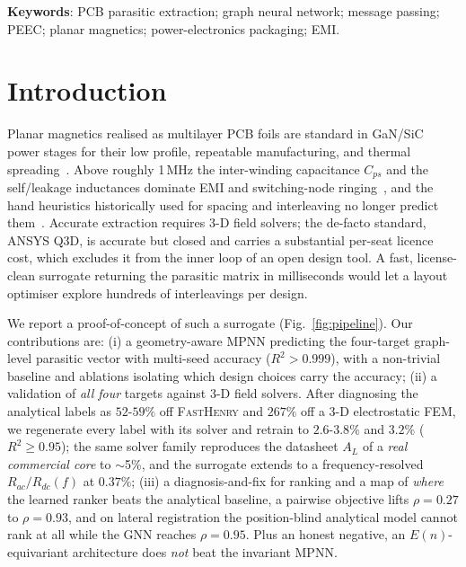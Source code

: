 \documentclass[letterpaper,twocolumn,9pt]{extarticle}
\begin{document}
\vspace{3pt}
\noindent\textbf{Keywords}: PCB parasitic extraction; graph neural network; message
passing; PEEC; planar magnetics; power-electronics packaging; EMI.

\section{Introduction}
Planar magnetics realised as multilayer PCB foils are standard in GaN/SiC power
stages for their low profile, repeatable manufacturing, and thermal
spreading~\cite{ouyang,hurley}. Above roughly 1\,MHz the inter-winding
capacitance $C_{ps}$ and the self/leakage inductances dominate EMI and
switching-node ringing~\cite{ott,paul}, and the hand heuristics historically used
for spacing and interleaving no longer predict them~\cite{erickson}. Accurate
extraction requires 3-D field solvers; the de-facto standard, ANSYS Q3D, is
accurate but closed and carries a substantial per-seat licence cost, which
excludes it from the inner loop of an open design tool. A fast, license-clean
surrogate returning the parasitic matrix in milliseconds would let a layout
optimiser explore hundreds of interleavings per design.

We report a proof-of-concept of such a surrogate (Fig.~\ref{fig:pipeline}). Our
contributions are: (i) a geometry-aware MPNN predicting the four-target
graph-level parasitic vector with multi-seed accuracy ($R^2>0.999$), with a
non-trivial baseline and ablations isolating which design choices carry the
accuracy; (ii) a validation of \emph{all four} targets against 3-D field
solvers. After diagnosing the analytical labels as $52$-$59\%$ off
\textsc{FastHenry} and $267\%$ off a 3-D electrostatic FEM, we regenerate every
label with its solver and retrain to $2.6$-$3.8\%$ and $3.2\%$
($R^2\!\ge\!0.95$); the same solver family reproduces the datasheet $A_L$ of a
\emph{real commercial core} to $\sim$5\%, and the surrogate extends to a
frequency-resolved $R_{ac}/R_{dc}(f)$ at $0.37\%$; (iii) a diagnosis-and-fix for
ranking and a map of \emph{where} the learned ranker beats the analytical
baseline, a pairwise objective lifts $\rho=0.27$ to $\rho=0.93$, and on lateral
registration the position-blind analytical model cannot rank at all while the GNN
reaches $\rho=0.95$. Plus an honest negative, an $E(n)$-equivariant architecture
does \emph{not} beat the invariant MPNN.
\end{document}
